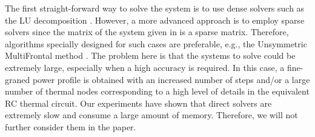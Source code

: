 The first straight-forward way to solve the system is to use dense solvers such as the LU decomposition \cite{press2007}. However, a more advanced approach is to employ sparse solvers since the matrix of the system given in  is a sparse matrix. Therefore, algorithms specially designed for such cases are preferable, e.g., the Unsymmetric MultiFrontal method \cite{umfpack2004}. The problem here is that the systems to solve could be extremely large, especially when a high accuracy is required. In this case, a fine-graned power profile is obtained with an increased number of steps and/or a large number of thermal nodes corresponding to a high level of details in the equivalent RC thermal circuit. Our experiments have shown that direct solvers are extremely slow and consume a large amount of memory. Therefore, we will not further consider them in the paper.
